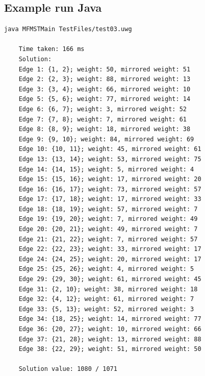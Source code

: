 \documentclass[12pt]{report}
\begin{document}
\subsection{Example run Java}
\begin{lstlisting}[basicstyle=\footnotesize]
	java MFMSTMain TestFiles/test03.uwg
	
	Time taken: 166 ms
	Solution:
	Edge 1: {1, 2}; weight: 50, mirrored weight: 51
	Edge 2: {2, 3}; weight: 88, mirrored weight: 13
	Edge 3: {3, 4}; weight: 66, mirrored weight: 10
	Edge 5: {5, 6}; weight: 77, mirrored weight: 14
	Edge 6: {6, 7}; weight: 3, mirrored weight: 52
	Edge 7: {7, 8}; weight: 7, mirrored weight: 61
	Edge 8: {8, 9}; weight: 18, mirrored weight: 38
	Edge 9: {9, 10}; weight: 84, mirrored weight: 69
	Edge 10: {10, 11}; weight: 45, mirrored weight: 61
	Edge 13: {13, 14}; weight: 53, mirrored weight: 75
	Edge 14: {14, 15}; weight: 5, mirrored weight: 4
	Edge 15: {15, 16}; weight: 17, mirrored weight: 20
	Edge 16: {16, 17}; weight: 73, mirrored weight: 57
	Edge 17: {17, 18}; weight: 17, mirrored weight: 33
	Edge 18: {18, 19}; weight: 57, mirrored weight: 7
	Edge 19: {19, 20}; weight: 7, mirrored weight: 49
	Edge 20: {20, 21}; weight: 49, mirrored weight: 7
	Edge 21: {21, 22}; weight: 7, mirrored weight: 57
	Edge 22: {22, 23}; weight: 33, mirrored weight: 17
	Edge 24: {24, 25}; weight: 20, mirrored weight: 17
	Edge 25: {25, 26}; weight: 4, mirrored weight: 5
	Edge 29: {29, 30}; weight: 61, mirrored weight: 45
	Edge 31: {2, 10}; weight: 38, mirrored weight: 18
	Edge 32: {4, 12}; weight: 61, mirrored weight: 7
	Edge 33: {5, 13}; weight: 52, mirrored weight: 3
	Edge 34: {18, 25}; weight: 14, mirrored weight: 77
	Edge 36: {20, 27}; weight: 10, mirrored weight: 66
	Edge 37: {21, 28}; weight: 13, mirrored weight: 88
	Edge 38: {22, 29}; weight: 51, mirrored weight: 50
	
	Solution value: 1080 / 1071
\end{lstlisting}
\end{document}
